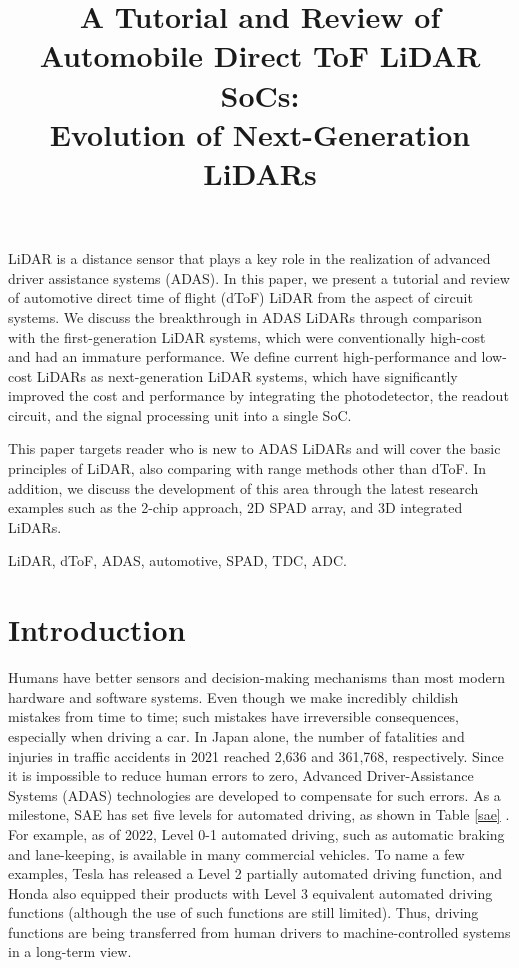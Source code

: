 \documentclass[paper]{ieice}
\title{\LARGE \bf
A Tutorial and Review of Automobile Direct ToF LiDAR SoCs: \\Evolution of Next-Generation LiDARs
}
\begin{document}
\maketitle
\thispagestyle{empty}
\pagestyle{empty}


\begin{summary}
LiDAR is a distance sensor that plays a key role in the realization of advanced driver assistance systems (ADAS).
In this paper, we present a tutorial and review of automotive direct time of flight (dToF) LiDAR from the aspect of circuit systems.
We discuss the breakthrough in ADAS LiDARs through comparison with the first-generation LiDAR systems, which were conventionally high-cost and had an immature performance. We define current high-performance and low-cost LiDARs as next-generation LiDAR systems, which have significantly improved the cost and performance by integrating the photodetector, the readout circuit, and the signal processing unit into a single SoC.

This paper targets reader who is new to ADAS LiDARs and will cover the basic principles of LiDAR, also comparing with range methods other than dToF.
In addition, we discuss the development of this area through the latest research examples such as the 2-chip approach, 2D SPAD array, and 3D integrated LiDARs.

\end{summary}

\begin{keywords}
LiDAR, dToF, ADAS, automotive, SPAD, TDC, ADC.
\end{keywords}
\section{Introduction}
\qquad Humans have better sensors and decision-making mechanisms than most modern hardware and software systems. Even though we make incredibly childish mistakes from time to time; such mistakes have irreversible consequences, especially when driving a car. In Japan alone, the number of fatalities and injuries in traffic accidents in 2021 reached 2,636 and 361,768, respectively\cite{keisatsu}. Since it is impossible to reduce human errors to zero, Advanced Driver-Assistance Systems (ADAS) technologies are developed to compensate for such errors. As a milestone, SAE has set five levels for automated driving, as shown in Table \ref{sae} \cite{sae}. For example, as of 2022, Level 0-1 automated driving, such as automatic braking and lane-keeping, is available in many commercial vehicles. To name a few examples, Tesla has released a Level 2 partially automated driving function, and Honda also equipped their products with Level 3 equivalent automated driving functions (although the use of such functions are still limited)\cite{honda}. Thus, driving functions are being transferred from human drivers to machine-controlled systems in a long-term view.
\end{document}
